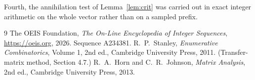 \documentclass[11pt,a4paper]{article}
\theoremstyle{plain}
\theoremstyle{definition}
\begin{document}
Fourth, the annihilation test of Lemma~\ref{lem:crit} was carried out in exact integer
arithmetic on the whole vector rather than on a sampled prefix.

\begin{thebibliography}{9}
 The OEIS Foundation, \emph{The On-Line Encyclopedia of Integer
Sequences}, \url{https://oeis.org}, 2026. Sequence A234381.
 R.~P.~Stanley, \emph{Enumerative Combinatorics}, Volume 1, 2nd ed.,
Cambridge University Press, 2011. (Transfer-matrix method, Section 4.7.)
 R.~A.~Horn and C.~R.~Johnson, \emph{Matrix Analysis}, 2nd ed., Cambridge
University Press, 2013.
\end{thebibliography}
\end{document}
